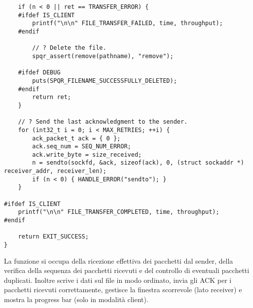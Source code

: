 \begin{lstlisting}
    if (n < 0 || ret == TRANSFER_ERROR) {
    #ifdef IS_CLIENT
        printf("\n\n" FILE_TRANSFER_FAILED, time, throughput);
    #endif

        // ? Delete the file.
        spqr_assert(remove(pathname), "remove");
    
    #ifdef DEBUG
        puts(SPQR_FILENAME_SUCCESSFULLY_DELETED);
    #endif
        return ret;
    }
    
    // ? Send the last acknowledgment to the sender.
    for (int32_t i = 0; i < MAX_RETRIES; ++i) {
        ack_packet_t ack = { 0 };
        ack.seq_num = SEQ_NUM_ERROR;
        ack.write_byte = size_received;
        n = sendto(sockfd, &ack, sizeof(ack), 0, (struct sockaddr *) receiver_addr, receiver_len);
        if (n < 0) { HANDLE_ERROR("sendto"); }
    }

#ifdef IS_CLIENT
    printf("\n\n" FILE_TRANSFER_COMPLETED, time, throughput);
#endif

    return EXIT_SUCCESS;
}
\end{lstlisting}

La funzione  si occupa della ricezione effettiva dei pacchetti dal sender, della verifica della sequenza dei pacchetti ricevuti e del controllo di eventuali pacchetti duplicati.
Inoltre scrive i dati sul file in modo ordinato, invia gli ACK per i pacchetti ricevuti correttamente, gestisce la finestra scorrevole (lato receiver) e mostra la progress bar (solo in modalità client).

